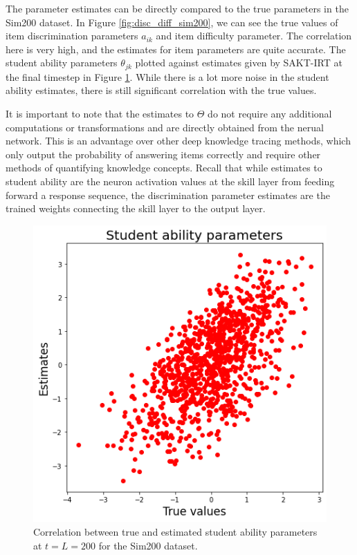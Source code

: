 The parameter estimates can be directly compared to the true parameters in the Sim200 dataset. In Figure \ref{fig:disc_diff_sim200}, we can see the true values of item discrimination parameters $a_{ik}$ and item difficulty parameter. The correlation here is very high, and the estimates for item parameters are quite accurate. The student ability parameters $\theta_{jk}$ plotted against estimates given by SAKT-IRT at the final timestep in Figure \ref{fig:theta_sim200}. While there is a lot more noise in the student ability estimates, there is still significant correlation with the true values. 

It is important to note that the estimates to $\Theta$ do not require any additional computations or transformations and are directly obtained from the nerual network. This is an advantage over other deep knowledge tracing methods, which only output the probability of answering items correctly and require other methods of quantifying knowledge concepts. Recall that while estimates to student ability are the neuron activation values at the skill layer from feeding forward a response sequence, the discrimination parameter estimates are the trained weights connecting the skill layer to the output layer.

\begin{figure}[h]
  \centering
  \includegraphics[width=.5\textwidth]{img/kt_irt/theta_est_attn2.png}
  \caption{Correlation between true and estimated student ability parameters at $t=L=200$ for the Sim200 dataset.}
  \label{fig:theta_sim200}
\end{figure}

